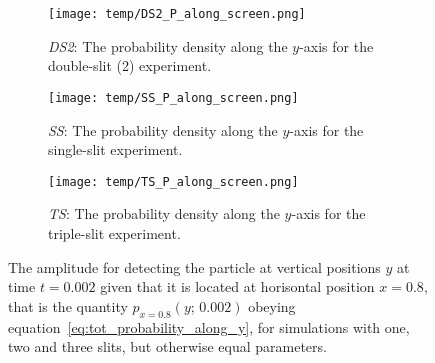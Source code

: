     \begin{figure}
        \centering
        \begin{subfigure}{0.46\textwidth}
            \texttt{[image: temp/DS2\_P\_along\_screen.png]}
            \caption{\textit{DS2}: The probability density along the $y$-axis for the double-slit (2) experiment.}
            \label{fig:p_along_y_DS2}
        \end{subfigure}
        \hfill
        \begin{subfigure}{0.46\textwidth}
            \texttt{[image: temp/SS\_P\_along\_screen.png]}
            \caption{\textit{SS}: The probability density along the $y$-axis for the single-slit experiment.}
            \label{fig:p_along_y_SS}
        \end{subfigure}
        \hfill
        \begin{subfigure}{0.46\textwidth}
            \texttt{[image: temp/TS\_P\_along\_screen.png]}
            \caption{\textit{TS}: The probability density along the $y$-axis for the triple-slit experiment.}
            \label{fig:p_along_y_TS}
        \end{subfigure}
        \caption{The amplitude for detecting the particle at vertical positions $y$ at time $t=0.002$ given that it is located at horisontal position $x=0.8$, that is the quantity $p_{x=0.8}(y;\, 0.002)$ obeying equation~\eqref{eq:tot_probability_along_y}, for simulations with one, two and three slits, but otherwise equal parameters.}
        \label{fig:p_along_y}
    \end{figure}






